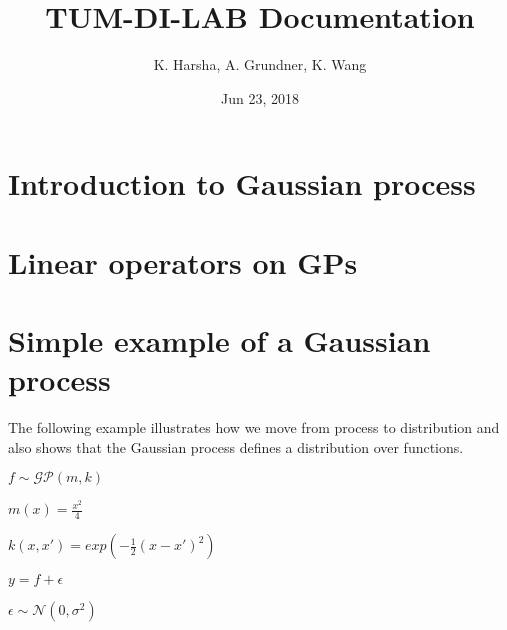 \documentclass[letterpaper,10pt,english]{sphinxmanual}
\title{TUM-DI-LAB Documentation}
\date{Jun 23, 2018}
\author{K. Harsha, A. Grundner, K. Wang}
\begin{document}
\maketitle
\sphinxtableofcontents
{}\label{\detokenize{index::doc}}



\chapter{Introduction to Gaussian process}
\label{\detokenize{report/1-intro_to_gp:introduction-to-gaussian-process}}\label{\detokenize{report/1-intro_to_gp::doc}}

\chapter{Linear operators on GPs}
\label{\detokenize{report/2-linear_op_gp:linear-operators-on-gps}}\label{\detokenize{report/2-linear_op_gp::doc}}

\chapter{Simple example of a Gaussian process}
\label{\detokenize{notebooks/simple_gp/simple_gp:simple-example-of-a-gaussian-process}}\label{\detokenize{notebooks/simple_gp/simple_gp::doc}}
The following example illustrates how we move from process to
distribution and also shows that the Gaussian process defines a
distribution over functions.

\(f \sim \mathcal{GP}(m,k)\)

\(m(x) = \frac{x^2}{4}\)

\(k(x,x') = exp(-\frac{1}{2}(x-x')^2)\)

\(y = f + \epsilon\)

\(\epsilon \sim \mathcal{N}(0, \sigma^2)\)

%
\begin{sphinxVerbatim}[commandchars=\\\{\}]
   
   
   
\end{sphinxVerbatim}

%
\begin{sphinxVerbatim}[commandchars=\\\{\}]
  
  
  
\end{sphinxVerbatim}
\end{document}
